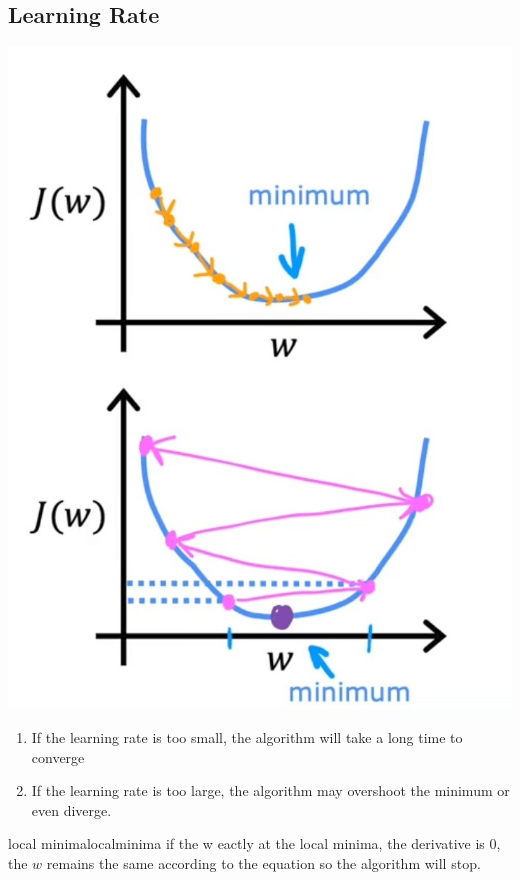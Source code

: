 \subsection*{Learning Rate}
\begin{minipage}{0.4\textwidth}
\includegraphics*[width=\textwidth]{images/2.3_2}
\end{minipage}
\begin{minipage}{0.6\textwidth}
\begin{enumerate}
    \item If the learning rate is too small, the algorithm will take a long time to converge\par
    \item If the learning rate is too large, %
    the algorithm may overshoot the minimum or even diverge.
\end{enumerate}
\end{minipage}

\begin{exbox}{local minima}{localminima}
    if the w eactly at the local minima, the derivative is 0,%
    the $w$ remains the same according to the equation so the algorithm will stop.
\end{exbox}

